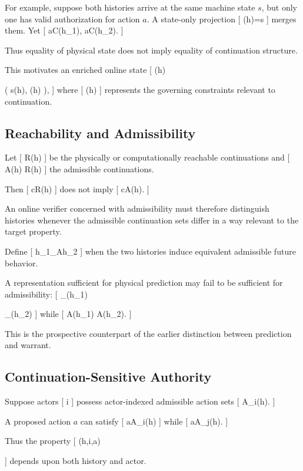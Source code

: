\documentclass[11pt]{article}
\begin{document}
For example, suppose both histories arrive at the same machine state $s$, but only one has valid authorization for action $a$. A state-only projection
[
\pi(h)=s
]
merges them. Yet
[
a\in\mathcal C(h_1),
\qquad
a\notin\mathcal C(h_2).
]

Thus equality of physical state does not imply equality of continuation structure.

This motivates an enriched online state
[
\sigma(h)

\bigl(
s(h),
\Gamma(h)
\bigr),
]
where
[
\Gamma(h)
]
represents the governing constraints relevant to continuation.

\subsection{Reachability and Admissibility}

Let
[
\mathcal R(h)
]
be the physically or computationally reachable continuations and
[
\mathcal A(h)
\subseteq
\mathcal R(h)
]
the admissible continuations.

Then
[
c\in\mathcal R(h)
]
does not imply
[
c\in\mathcal A(h).
]

An online verifier concerned with admissibility must therefore distinguish histories whenever the admissible continuation sets differ in a way relevant to the target property.

Define
[
h_1\equiv_{\mathcal A}h_2
]
when the two histories induce equivalent admissible future behavior.

A representation sufficient for physical prediction may fail to be sufficient for admissibility:
[
\pi_{}(h_1)

\pi_{}(h_2)
]
while
[
\mathcal A(h_1)
\neq
\mathcal A(h_2).
]

This is the prospective counterpart of the earlier distinction between prediction and warrant.

\subsection{Continuation-Sensitive Authority}

Suppose actors
[
i
]
possess actor-indexed admissible action sets
[
\mathcal A_i(h).
]

A proposed action $a$ can satisfy
[
a\in\mathcal A_i(h)
]
while
[
a\notin\mathcal A_j(h).
]

Thus the property
[
\Phi(h,i,a)

]
depends upon both history and actor.
\end{document}
